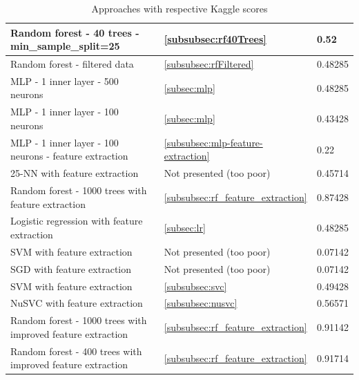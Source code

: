 \documentclass[a4paper, 11pt, oneside]{article}
\begin{document}
\begin{table}[H]
{\begin{tabular}{|l|l|l|}
Random forest - 40 trees - min\_sample\_split=25            & \ref{subsubsec:rf40Trees}                    & 0.52                                       \\ \hline
Random forest - filtered data                               & \ref{subsubsec:rfFiltered}                   & 0.48285                                    \\ \hline
MLP - 1 inner layer - 500 neurons                           & \ref{subsec:mlp}                               & 0.48285                                    \\ \hline
MLP - 1 inner layer - 100 neurons                           & \ref{subsec:mlp}                                 & 0.43428                                    \\ \hline
MLP - 1 inner layer - 100 neurons - feature extraction      & \ref{subsubsec:mlp-feature-extraction}                                  & 0.22                                       \\ \hline
25-NN with feature extraction                               & Not presented (too poor)                              & 0.45714                                    \\ \hline
Random forest - 1000 trees with feature extraction          & \ref{subsubsec:rf_feature_extraction}                                & 0.87428                                    \\ \hline
Logistic regression with feature extraction                 & \ref{subsec:lr}                               & 0.48285                                    \\ \hline
SVM with feature extraction                                 & Not presented (too poor)                              & 0.07142                                    \\ \hline
SGD with feature extraction                                 & Not presented (too poor)                         & 0.07142                                    \\ \hline
SVM with feature extraction                                 & \ref{subsubsec:svc}                          & 0.49428                                    \\ \hline
NuSVC with feature extraction                               & \ref{subsubsec:nusvc}                        & 0.56571                                    \\ \hline
Random forest - 1000 trees with improved feature extraction & \ref{subsubsec:rf_feature_extraction}                                 & 0.91142                                    \\ \hline
Random forest - 400 trees with improved feature extraction & \ref{subsubsec:rf_feature_extraction}                                 & 0.91714                                   \\ \hline
\end{tabular}
}
\caption{Approaches with respective Kaggle scores}
\end{table}
\end{document}
